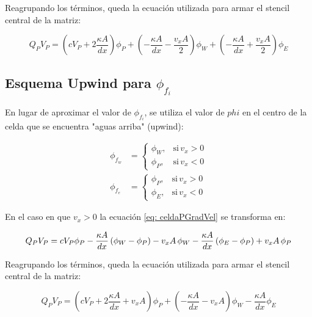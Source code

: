 \documentclass{article}
\begin{document}
        Reagrupando los términos, queda la ecuación utilizada para armar el stencil central de la matriz:

        \begin{equation}
			Q_P V_P = \left( c  V_P + 2 \frac{\kappa A}{dx} \right) \phi_P
			+ \left( -\frac{\kappa A}{dx} - \frac{v_x A}{2} \right) \phi_W
			+ \left( -\frac{\kappa A}{dx} + \frac{v_x A}{2} \right) \phi_E
            \label{eq: stencilCentral}
        \end{equation}

    \subsection{Esquema Upwind para $\phi_{f_i}$}

		En lugar de aproximar el valor de $\phi_{f_i}$, se utiliza el valor de $phi$ en el centro de la celda que se encuentra "aguas arriba" (upwind):

		\begin{equation*}
            \begin{aligned}
			\phi_{f_w} &=
				\begin{cases}
				\phi_W, & \text{si} \, v_x > 0 \\
				\phi_P, & \text{si} \, v_x < 0
				\end{cases}
			\\
			\phi_{f_e} &=
				\begin{cases}
				\phi_P, & \text{si} \, v_x > 0 \\
				\phi_E, & \text{si} \, v_x < 0
				\end{cases}
			\end{aligned}
		\end{equation*}

		En el caso en que $v_x > 0$ la ecuación \ref{eq: celdaPGradVel} se transforma en:

		\begin{equation*}
			Q_P V_P = c  V_P \phi_P - \frac{\kappa A}{dx} \left( \phi_W - \phi_P \right) - v_x A \, \phi_W \\
			- \frac{\kappa A}{dx} \left( \phi_E - \phi_P \right) + v_x A \, \phi_P
		\end{equation*}

		Reagrupando los términos, queda la ecuación utilizada para armar el stencil central de la matriz:

		\begin{equation}
			Q_P V_P = \left( c V_P + 2 \frac{\kappa A}{dx} + v_x A \right) \phi_P
			+ \left( -\frac{\kappa A}{dx} - v_x A \right) \phi_W
			-\frac{\kappa A}{dx} \phi_E
			\label{eq: stencilCentralUpwind1}
		\end{equation}
\end{document}
